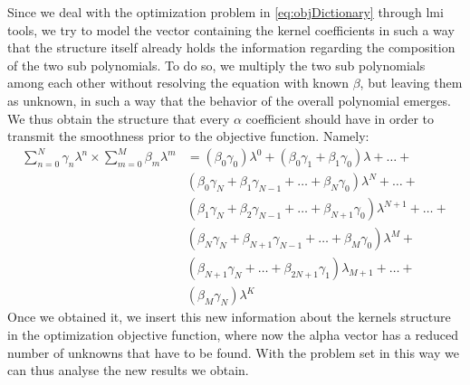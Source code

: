 Since we deal with the optimization problem in \autoref{eq:objDictionary} through \gls{lmi} tools, we try to model the vector containing the kernel coefficients in such a way that the structure itself already holds the information regarding the composition of the two sub polynomials. To do so, we multiply the two sub polynomials among each other without resolving the equation with known $\beta$, but leaving them as unknown, in such a way that the behavior of the overall polynomial emerges. We thus obtain the structure that every $\alpha$ coefficient should have in order to transmit the smoothness prior to the objective function. Namely:
\begin{equation}
  \begin{split}
    \sum_{n=0}^N\gamma_n \lambda^n \times \sum_{m=0}^M \beta_m \lambda^m &= (\beta_0  \gamma_0)\lambda^0   + (\beta_0 \gamma_1 + \beta_1 \gamma_0)\lambda + \dots + \\
    &(\beta_0 \gamma_N + \beta_1 \gamma_{N-1} + \dots + \beta_N \gamma_0)\lambda^N + \dots + \\
    &(\beta_1 \gamma_N + \beta_2 \gamma_{N-1} + \dots + \beta_{N+1} \gamma_0)\lambda^{N+1} + \dots +\\
    &(\beta_{N} \gamma_{N} + \beta_{N+1} \gamma_{N-1} + \dots + \beta_{M} \gamma_0)\lambda^{M} + \\
    &(\beta_{N+1} \gamma_{N} + \dots + \beta_{2N + 1} \gamma_1)\lambda_{M+1} + \dots +\\
    &(\beta_M \gamma_N)\lambda^{K}
  \end{split}
  \label{eq:sviluppo}
\end{equation}
Once we obtained it, we insert this new information about the kernels structure in the optimization objective function, where now the alpha vector has a reduced number of unknowns that have to be found. With the problem set in this way we can thus analyse the new results we obtain.

